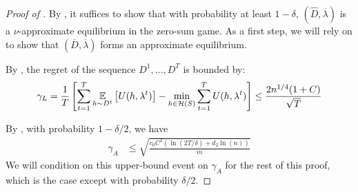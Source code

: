 \begin{proof}[Proof of ]
  By , it suffices to show that with probability at
  least $1 - \delta$, $(\hat D, \overline \lambda)$ is a
  $\nu$-approximate equilibrium in the zero-sum game. As a first step,
  we will rely on  to show that
  $(\overline D, \overline \lambda)$ forms an approximate equilibrium.

  By , the regret of the sequence
  $D^1, \ldots , D^T$ is bounded by:
  \[
    \gamma_L = \frac{1}{T}\left[\sum_{t= 1}^T \operatorname*{\mathbb{E}}_{h\sim D^t}\left[U(h,
        \lambda^t)\right] - \min_{h\in \mathcal{H}(S)}\sum_{t=1}^T U(h, \lambda^t)
    \right] \leq \frac{2 n^{1/4} {(1+C)}}{\sqrt{T}}
  \]


  By , with probability $1 - \delta/2$, we have
\begin{align*}
  \gamma_A &\leq \sqrt{\frac{c_0 C^2 (\ln(2T/\delta) + d_2
        \ln(n))}{m}}
\end{align*}
  We will condition on this upper-bound event on $\gamma_A$ for the
  rest of this proof, which is the case except with probability
  $\delta/2$.


\end{proof}
